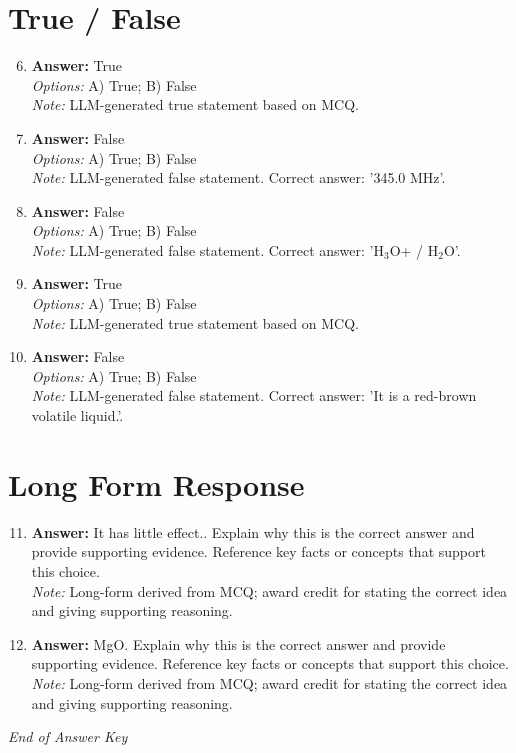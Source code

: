 \documentclass[12pt]{article}
\begin{document}
\section*{True / False}
\begin{enumerate}[label=\arabic*.]
\setcounter{enumi}{5}
\item \textbf{Answer:} True
\\ \textit{Options:} A) True; B) False
\\ \textit{Note:} LLM-generated true statement based on MCQ.
\item \textbf{Answer:} False
\\ \textit{Options:} A) True; B) False
\\ \textit{Note:} LLM-generated false statement. Correct answer: '345.0 MHz'.
\item \textbf{Answer:} False
\\ \textit{Options:} A) True; B) False
\\ \textit{Note:} LLM-generated false statement. Correct answer: 'H$_{3}$O+ / H$_{2}$O'.
\item \textbf{Answer:} True
\\ \textit{Options:} A) True; B) False
\\ \textit{Note:} LLM-generated true statement based on MCQ.
\item \textbf{Answer:} False
\\ \textit{Options:} A) True; B) False
\\ \textit{Note:} LLM-generated false statement. Correct answer: 'It is a red-brown volatile liquid.'.
\end{enumerate}

\section*{Long Form Response}
\begin{enumerate}[label=\arabic*.]
\setcounter{enumi}{10}
\item \textbf{Answer:} It has little effect.. Explain why this is the correct answer and provide supporting evidence. Reference key facts or concepts that support this choice.
\\ \textit{Note:} Long-form derived from MCQ; award credit for stating the correct idea and giving supporting reasoning.
\item \textbf{Answer:} MgO. Explain why this is the correct answer and provide supporting evidence. Reference key facts or concepts that support this choice.
\\ \textit{Note:} Long-form derived from MCQ; award credit for stating the correct idea and giving supporting reasoning.
\end{enumerate}

\vfill
\noindent\textit{End of Answer Key}
\end{document}
